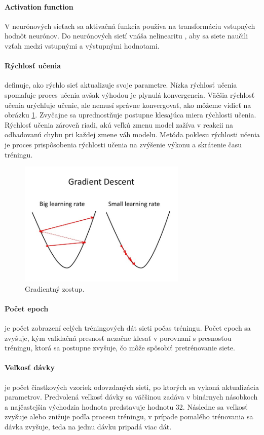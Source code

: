 \paragraph{Activation function}
V neurónových sieťach sa aktivačná funkcia používa na transformáciu vstupných hodnôt neurónov. Do neurónových sietí vnáša nelinearitu , aby sa siete naučili vzťah medzi vstupnými a výstupnými hodnotami.

\paragraph{Rýchlosť učenia} definuje, ako rýchlo sieť aktualizuje svoje parametre. Nízka rýchlosť učenia spomaľuje proces učenia avšak výhodou je plynulá konvergencia. Väčšia rýchlosť učenia urýchľuje učenie, ale nemusí správne konvergovať, ako môžeme vidieť na obrázku \ref{learningrate}. Zvyčajne sa uprednostňuje postupne klesajúca miera rýchlosti učenia. Rýchlosť učenia zároveň riadi, akú veľkú zmenu model zažíva v reakcii na odhadovanú chybu pri každej zmene váh modelu. Metóda poklesu rýchlosti učenia je proces prispôsobenia rýchlosti učenia na zvýšenie výkonu a skrátenie času tréningu.

\begin{figure}[!htbp]
  \centering
  \includegraphics[width=8cm]{img/learningrate.jpg}
  \caption{Gradientný zostup.}
  \label{learningrate}
\end{figure}

\paragraph{Počet epoch} je počet zobrazení celých tréningových dát sieti počas tréningu. Počet epoch sa zvyšuje, kým validačná presnosť nezačne klesať v porovnaní s presnosťou tréningu, ktorá sa postupne zvyšuje, čo môže spôsobiť pretrénovanie siete.

\paragraph{Veľkosť dávky} je počet čiastkových vzoriek odovzdaných sieti, po ktorých sa vykoná aktualizácia parametrov. Predvolená veľkosť dávky sa väčšinou zadáva v binárnych násobkoch a najčastejšia východzia hodnota predstavuje hodnotu 32. Následne sa veľkosť zvyšuje alebo znižuje podľa procesu tréningu, v prípade pomalého trénovania sa dávka zvyšuje, teda na jednu dávku pripadá viac dát.


